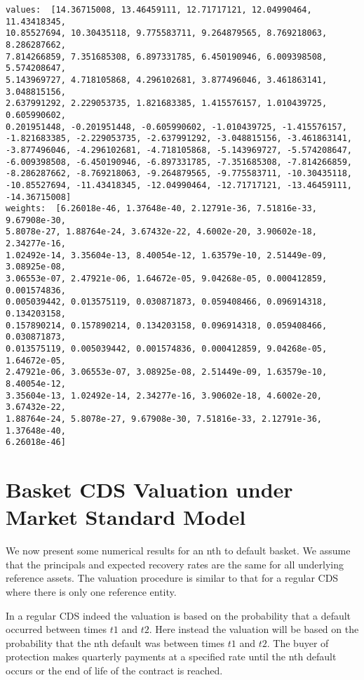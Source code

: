 \begin{tcolorbox}[breakable, size=fbox, boxrule=1pt, pad at break*=1mm,colback=cellbackground, colframe=cellborder]
\begin{Verbatim}[commandchars=\\\{\}]
values:  [14.36715008, 13.46459111, 12.71717121, 12.04990464, 11.43418345,
10.85527694, 10.30435118, 9.775583711, 9.264879565, 8.769218063, 8.286287662,
7.814266859, 7.351685308, 6.897331785, 6.450190946, 6.009398508, 5.574208647,
5.143969727, 4.718105868, 4.296102681, 3.877496046, 3.461863141, 3.048815156,
2.637991292, 2.229053735, 1.821683385, 1.415576157, 1.010439725, 0.605990602,
0.201951448, -0.201951448, -0.605990602, -1.010439725, -1.415576157,
-1.821683385, -2.229053735, -2.637991292, -3.048815156, -3.461863141,
-3.877496046, -4.296102681, -4.718105868, -5.143969727, -5.574208647,
-6.009398508, -6.450190946, -6.897331785, -7.351685308, -7.814266859,
-8.286287662, -8.769218063, -9.264879565, -9.775583711, -10.30435118,
-10.85527694, -11.43418345, -12.04990464, -12.71717121, -13.46459111,
-14.36715008]
weights:  [6.26018e-46, 1.37648e-40, 2.12791e-36, 7.51816e-33, 9.67908e-30,
5.8078e-27, 1.88764e-24, 3.67432e-22, 4.6002e-20, 3.90602e-18, 2.34277e-16,
1.02492e-14, 3.35604e-13, 8.40054e-12, 1.63579e-10, 2.51449e-09, 3.08925e-08,
3.06553e-07, 2.47921e-06, 1.64672e-05, 9.04268e-05, 0.000412859, 0.001574836,
0.005039442, 0.013575119, 0.030871873, 0.059408466, 0.096914318, 0.134203158,
0.157890214, 0.157890214, 0.134203158, 0.096914318, 0.059408466, 0.030871873,
0.013575119, 0.005039442, 0.001574836, 0.000412859, 9.04268e-05, 1.64672e-05,
2.47921e-06, 3.06553e-07, 3.08925e-08, 2.51449e-09, 1.63579e-10, 8.40054e-12,
3.35604e-13, 1.02492e-14, 2.34277e-16, 3.90602e-18, 4.6002e-20, 3.67432e-22,
1.88764e-24, 5.8078e-27, 9.67908e-30, 7.51816e-33, 2.12791e-36, 1.37648e-40,
6.26018e-46]
\end{Verbatim}
\end{tcolorbox}

\section{Basket CDS Valuation under Market Standard Model}\label{basket-cds-valuation-under-market-standard-model}
We now present some numerical results for an nth to default basket.
We assume that the principals and expected recovery rates are the same
for all underlying reference assets. The valuation procedure is similar
to that for a regular CDS where there is only one reference entity.

In a regular CDS indeed the valuation is based on the probability that a
default occurred between times \(t1\) and \(t2\). Here instead the
valuation will be based on the probability that the nth default was
between times \(t1\) and \(t2\).
The buyer of protection makes quarterly payments at a
specified rate until the nth default occurs or the end of life
of the contract is reached.

